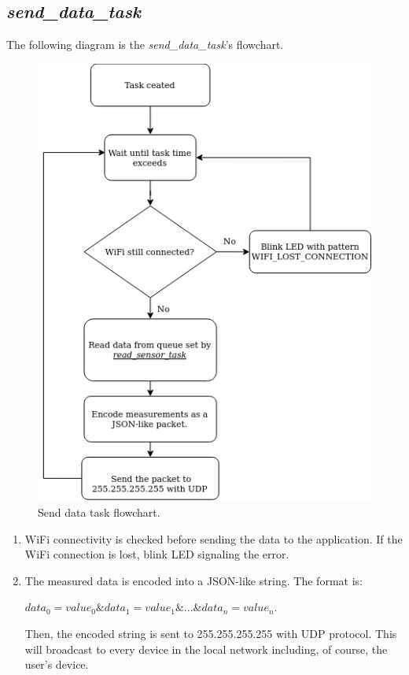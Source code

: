 \documentclass[../main.tex]{subfiles}
\begin{document}
    \pagebreak
    \subsection{\textit{send\_data\_task}}
    The following diagram is the \textit{send\_data\_task}'s flowchart.

    \begin{figure}[!h]
        \centerline{\includegraphics[scale=0.55]{media/send_data_task_flowchart.drawio.png}}
        \caption{Send data task flowchart.}
        \label{fig:send_data_task_flowchart}
    \end{figure}
    
    \begin{enumerate}
        \item WiFi connectivity is checked before sending the data to the application. If the WiFi connection is lost, blink LED signaling the error.
        \item The measured data is encoded into a JSON-like string. The format is: \newline \centerline{${data}_0={value}_0\&{data}_1={value}_1\&...\&{data}_n={value}_n$.}\newline Then, the encoded string is sent to 255.255.255.255 with UDP protocol. This will broadcast to every device in the local network including, of course, the user's device.
    \end{enumerate}
\end{document}
